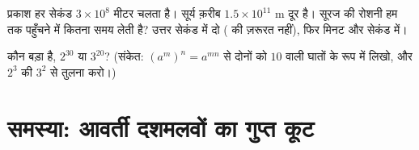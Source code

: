 \begin{exercise}[$\star\star$]\label{exo:g9:fractions:9}
प्रकाश हर सेकंड $3 \times 10^8$ मीटर चलता है। सूर्य क़रीब
$1.5 \times 10^{11}$ m दूर है। सूरज की रोशनी हम तक पहुँचने में
कितना समय लेती है? उत्तर सेकंड में दो ( की ज़रूरत
नहीं), फिर मिनट और सेकंड में।
\end{exercise}

\begin{exercise}[$\star\star\star$]\label{exo:g9:fractions:10}
कौन बड़ा है, $2^{30}$ या $3^{20}$? (संकेत:
$\left(a^m\right)^n = a^{mn}$ से दोनों को  $10$ वाली घातों के
रूप में लिखो, और $2^3$ की $3^2$ से तुलना करो।)
\end{exercise}

\section{समस्या: आवर्ती दशमलवों का गुप्त कूट}

